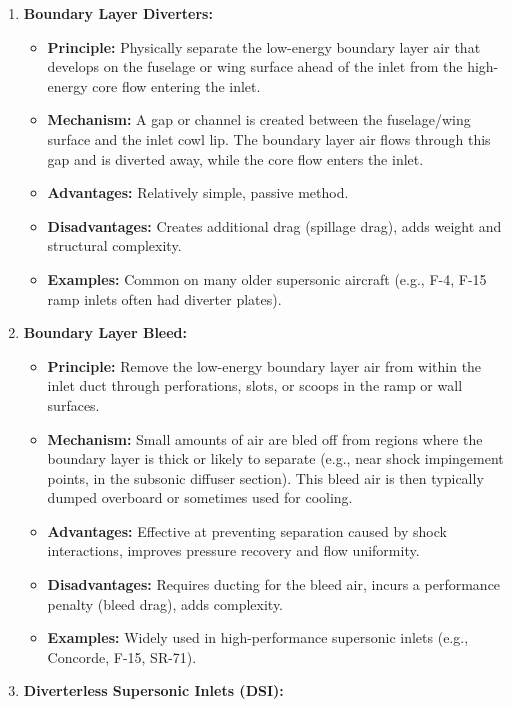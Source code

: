 \begin{enumerate}
\def\labelenumi{\arabic{enumi}.}
\tightlist
\item
  \textbf{Boundary Layer Diverters:}

  \begin{itemize}
  \tightlist
  \item
    \textbf{Principle:} Physically separate the low-energy boundary
    layer air that develops on the fuselage or wing surface ahead of the
    inlet from the high-energy core flow entering the inlet.
  \item
    \textbf{Mechanism:} A gap or channel is created between the
    fuselage/wing surface and the inlet cowl lip. The boundary layer air
    flows through this gap and is diverted away, while the core flow
    enters the inlet.
  \item
    \textbf{Advantages:} Relatively simple, passive method.
  \item
    \textbf{Disadvantages:} Creates additional drag (spillage drag),
    adds weight and structural complexity.
  \item
    \textbf{Examples:} Common on many older supersonic aircraft (e.g.,
    F-4, F-15 ramp inlets often had diverter plates).
  \end{itemize}
\item
  \textbf{Boundary Layer Bleed:}

  \begin{itemize}
  \tightlist
  \item
    \textbf{Principle:} Remove the low-energy boundary layer air from
    within the inlet duct through perforations, slots, or scoops in the
    ramp or wall surfaces.
  \item
    \textbf{Mechanism:} Small amounts of air are bled off from regions
    where the boundary layer is thick or likely to separate (e.g., near
    shock impingement points, in the subsonic diffuser section). This
    bleed air is then typically dumped overboard or sometimes used for
    cooling.
  \item
    \textbf{Advantages:} Effective at preventing separation caused by
    shock interactions, improves pressure recovery and flow uniformity.
  \item
    \textbf{Disadvantages:} Requires ducting for the bleed air, incurs a
    performance penalty (bleed drag), adds complexity.
  \item
    \textbf{Examples:} Widely used in high-performance supersonic inlets
    (e.g., Concorde, F-15, SR-71).
  \end{itemize}
\item
  \textbf{Diverterless Supersonic Inlets (DSI):}


\end{enumerate}
